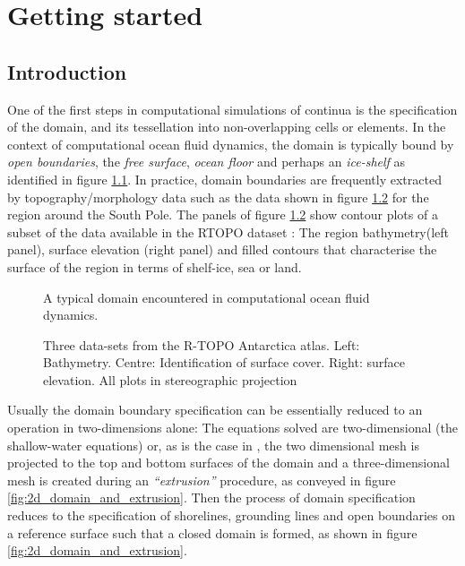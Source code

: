 \chapter{Getting started}
\label{chptr:getting_started}

\section{Introduction}
\label{sect:introduction}
One of the first steps in computational simulations of continua is the specification of the domain, and its tessellation into non-overlapping cells or elements. In the context of computational ocean fluid dynamics, the domain is typically bound by \emph{open boundaries}, the \emph{free surface}, \emph{ocean floor} and perhaps an \emph{ice-shelf} as identified in figure \ref{fig:typical_ocean_modelling_domain}. In practice, domain boundaries are frequently extracted by topography/morphology data such as the data shown in figure \ref{fig:rtopo_atlas} for the region around the South Pole. The panels of figure \ref{fig:rtopo_atlas} show contour plots of a subset of the data available in the RTOPO dataset \citep{timmermann_et_al:2010}: The region bathymetry(left panel), surface elevation (right panel) and filled contours that characterise the surface of the region in terms of shelf-ice, sea or land.
\begin{figure}[htb!]\begin{center}
\caption[A typical domain encountered in computational ocean fluid dynamics.]{A typical domain encountered in computational ocean fluid dynamics.}
\label{fig:typical_ocean_modelling_domain}
\end{center}\end{figure}
\begin{figure}[htb!]\begin{center}
\caption[Data from the the R-TOPO Antarctica atlas.]{Three data-sets from the R-TOPO Antarctica atlas. Left: Bathymetry. Centre: Identification of surface cover. Right: surface elevation. All plots in stereographic projection}
\label{fig:rtopo_atlas}
\end{center}\end{figure}
\par
Usually the domain boundary specification can be essentially reduced to an operation in two-dimensions alone: The equations solved are two-dimensional (\eg the shallow-water equations) or, as is the case in \fluidity, the two dimensional mesh is projected to the top and bottom surfaces of the domain and a three-dimensional mesh is created during an \emph{``extrusion''} procedure, as conveyed in figure \ref{fig:2d_domain_and_extrusion}. Then the process of domain specification reduces to the specification of shorelines, grounding lines and open boundaries on a reference surface such that a closed domain is formed, as shown in figure \ref{fig:2d_domain_and_extrusion}. 
